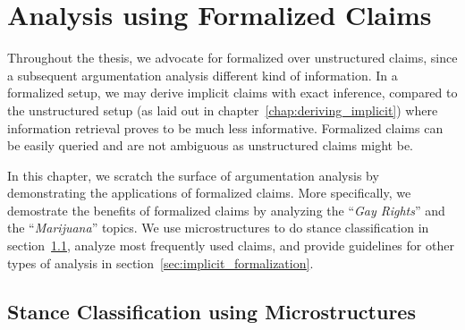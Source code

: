 \chapter{Analysis using Formalized Claims}
\label{chap:analysis}


Throughout the thesis, we advocate for formalized over unstructured claims,
since a subsequent argumentation analysis different kind of information.  In a
formalized setup, we may derive implicit claims with exact inference, compared
to the unstructured setup (as laid out in chapter~\ref{chap:deriving_implicit})
where information retrieval proves to be much less informative.  Formalized
claims can be easily queried and are not ambiguous as unstructured claims might
be. 

% 


In this chapter, we scratch the surface of argumentation analysis by
demonstrating the applications of formalized claims.  More specifically, we
demostrate the benefits of formalized claims by analyzing the ``\emph{Gay
Rights}'' and the ``\emph{Marijuana}'' topics. 
We use microstructures to do stance classification in
section~\ref{sec:stance_micro}, analyze most frequently used
claims, and provide guidelines for other types
of analysis in section~\ref{sec:implicit_formalization}. 


\section{Stance Classification using Microstructures}
\label{sec:stance_micro}

